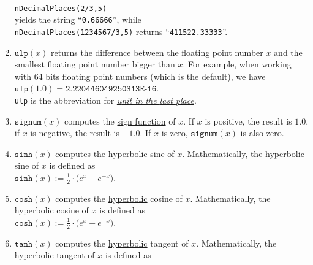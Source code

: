 \begin{enumerate}
      \\[0.2cm]
      \hspace*{1.3cm}
      \texttt{nDecimalPlaces(2/3,5)}
      \\[0.2cm]
      yields the string ``\texttt{0.66666}'', while 
      \\[0.2cm]
      \hspace*{1.3cm}
      \texttt{nDecimalPlaces(1234567/3,5)} returns ``\texttt{411522.33333}''.
\item $\mathtt{ulp}(x)$  returns the difference between the floating point number $x$ and
      the smallest floating point number bigger than $x$.  For example, when working with
      64 bits floating point numbers (which is the default), we have
      \\[0.2cm]
      \hspace*{1.3cm}
      $\mathtt{ulp}(1.0) = \texttt{2.220446049250313E-16}$.
      \\[0.2cm]
      \texttt{ulp} is the abbreviation for 
      \href{https://en.wikipedia.org/wiki/Unit_in_the_last_place}{\emph{\underline{u}nit in the \underline{l}ast \underline{p}lace}}. 
\item $\mathtt{signum}(x)$ computes the 
      \href{https://en.wikipedia.org/wiki/Sign_function}{sign function} of $x$.  If $x$ is positive,
      the result is $1.0$, if $x$ is negative, the result is $-1.0$.  If $x$ is zero,
      $\mathtt{signum}(x)$ is also zero.
\item $\texttt{sinh}(x)$ computes the
      \href{https://en.wikipedia.org/wiki/Hyperbolic_function}{hyperbolic} sine of $x$.  
      Mathematically, the hyperbolic sine of $x$ is defined as 
      \\[0.2cm]
      \hspace*{1.3cm}
      $\mathtt{sinh}(x) := \frac{1}{2} \cdot \bigl(e^x - e^{-x}\bigr)$.
\item $\texttt{cosh}(x)$ computes the
      \href{https://en.wikipedia.org/wiki/Hyperbolic_function}{hyperbolic} cosine of $x$.
      Mathematically, the hyperbolic cosine of $x$ is defined as 
      \\[0.2cm]
      \hspace*{1.3cm}
      $\mathtt{cosh}(x) := \frac{1}{2} \cdot \bigl(e^x + e^{-x}\bigr)$.
\item $\texttt{tanh}(x)$ computes the
      \href{https://en.wikipedia.org/wiki/Hyperbolic_function}{hyperbolic} tangent of $x$.  
      Mathematically, the hyperbolic tangent of $x$ is defined as 
      \\[0.2cm]

\end{enumerate}
